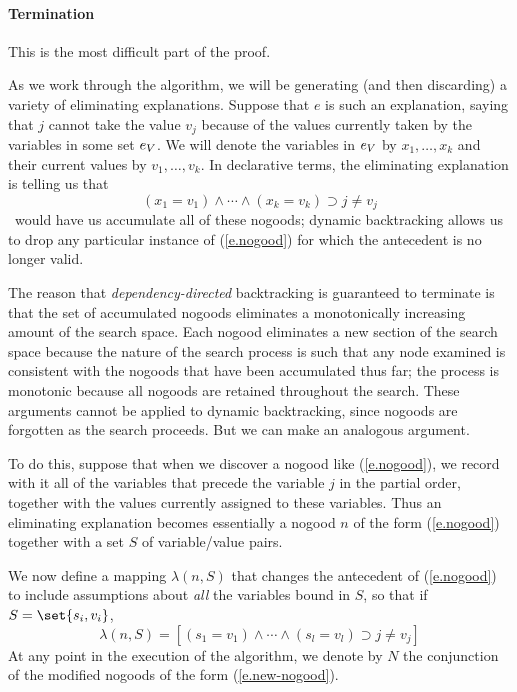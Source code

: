 \paragraph{Termination} This is the most difficult part of the proof.

As we work through the algorithm, we will be generating (and then
discarding) a variety of eliminating explanations.  Suppose that $e$
is such an explanation, saying that $j$ cannot take the value $v_j$
because of the values currently taken by the variables in some set
$e_V$.  We will denote the variables in $e_V$ by $x_1,\dots,x_k$
and their current values by $v_1,\dots,v_k$.  In declarative terms,
the eliminating explanation is telling us that
 \begin{equation}
(x_1=v_1) \wedge\cdots\wedge (x_k=v_k) \supset j\neq v_j
 \label{e.nogood}
 \end{equation}
 \Ddb\ would have us accumulate all of these nogoods; dynamic
backtracking allows us to drop any particular instance of
(\ref{e.nogood}) for which the antecedent is no longer valid.

The reason that {\em dependency-directed\/} backtracking is guaranteed
to terminate is that the set of accumulated nogoods eliminates a
monotonically increasing amount of the search space.  Each nogood
eliminates a new section of the search space because the nature of the
search process is such that any node examined is consistent with the
nogoods that have been accumulated thus far; the process is monotonic
because all nogoods are retained throughout the search.  These
arguments cannot be applied to dynamic backtracking, since nogoods are
forgotten as the search proceeds.  But we can make an analogous
argument.

To do this, suppose that when we discover a nogood like
(\ref{e.nogood}), we record with it all of the variables that precede
the variable $j$ in the partial order, together with the values
currently assigned to these variables.  Thus an eliminating
explanation becomes essentially a nogood $n$ of the form
(\ref{e.nogood}) together with a set $S$ of variable/value pairs.

We now define a mapping $\lambda(n,S)$ that changes the antecedent
of (\ref{e.nogood}) to include assumptions about {\em all\/} the
variables bound in $S$, so that if $S=\set{s_i,v_i}$, 
 \begin{equation}
\lambda(n,S) = [(s_1=v_1) \wedge\cdots\wedge (s_l=v_l) \supset j\neq v_j]
 \label{e.new-nogood}
 \end{equation}
 At any point in the execution of the algorithm, we denote by $N$ the
conjunction of the modified nogoods of the form (\ref{e.new-nogood}).

